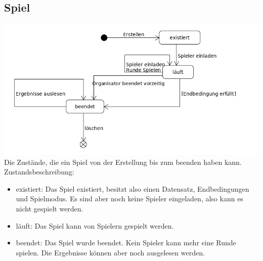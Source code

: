 \documentclass[a4paper]{scrreprt}
\begin{document}
    \subsection{Spiel}
    \label{fig:Spiel_State}
    \includegraphics[width=\textwidth]{uml/export/Spiel_Zustand.png}
    Die Zustände, die ein Spiel von der Erstellung bis zum beenden haben kann.
    Zustandsbeschreibung:
    \begin{itemize}
    \item existiert: Das Spiel existiert, besitzt also einen Datensatz, Endbedingungen und Spielmodus. Es sind aber noch keine Spieler eingeladen, also kann es nicht gespielt werden.
    \item läuft: Das Spiel kann von Spielern gespielt werden.
    \item beendet: Das Spiel wurde beendet. Kein Spieler kann mehr eine Runde spielen. Die Ergebnisse können aber noch ausgelesen werden. 
    \end{itemize}
\end{document}

